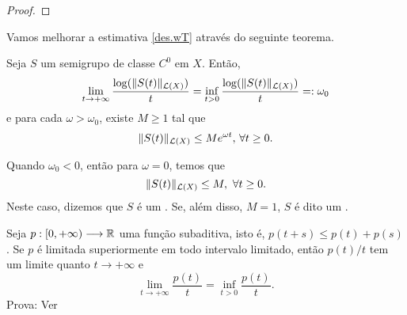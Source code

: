 \begin{proof}

\end{proof}

Vamos melhorar a estimativa \eqref{des.wT} através do seguinte teorema. 
\begin{theorem}\label{th2.5}
Seja $S$ um semigrupo de classe $C^0$ em $X$. Então,
\[\lim\limits_{t\to +\infty}\frac{\log(\|S(t)\|_{\mathcal{L}(X)})}{t}=\inf\limits_{t>0}\frac{\log(\|S(t)\|_{\mathcal{L}(X)})}{t}=:\omega_0\]
e para cada $\omega>\omega_0$, existe {$M\geq 1$} tal que 
\begin{equation}\label{Sbound}
{\|S(t)\|_{\mathcal{L}(X)}\leq Me^{\omega t},\, \forall t\geq 0.}
\end{equation}
\end{theorem} 


\begin{remark}
Quando $\omega_0<0$, então para $\omega=0$, temos que 
\[\|S(t)\|_{\mathcal{L}(X)}\leq M,\ \forall t\geq 0. \]
Neste caso, dizemos que $S$ é um . Se, além disso, $M=1$, $S$ é dito um . 
    
\end{remark}


\begin{lemma}\label{lem2.5}
    Seja $p:[0,+\infty)\longrightarrow \mathbb{R}$ uma função {subaditiva}, isto é, $p(t+s)\leq p(t)+p(s)$. Se $p$ é limitada superiormente em todo intervalo limitado, então $p(t)/t$ tem um limite quanto $t\to +\infty$ e 
    \[\lim\limits_{t\to +\infty}\frac{p(t)}{t}=\inf\limits_{t>0}\frac{p(t)}{t}.\]
Prova: Ver \cite[Lema 1.2.5]{gomes1985semigrupos} 
\end{lemma}


